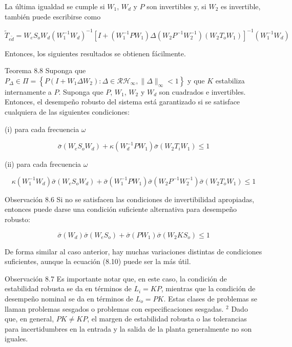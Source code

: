 La última igualdad se cumple si $W_{1}$, $W_{d}$ y $P$ son invertibles y, si $W_{2}$ es invertible, también puede escribirse como

$$
\tilde{T}_{e \tilde{d}}=W_{e} S_{o} W_{d}\left(W_{1}^{-1} W_{d}\right)^{-1}\left[I+\left(W_{1}^{-1} P W_{1}\right) \Delta\left(W_{2} P^{-1} W_{2}^{-1}\right)\left(W_{2} T_{o} W_{1}\right)\right]^{-1}\left(W_{1}^{-1} W_{d}\right)
$$

Entonces, los siguientes resultados se obtienen fácilmente.

Teorema 8.8 Suponga que $P_{\Delta} \in \Pi=\left\{P\left(I+W_{1} \Delta W_{2}\right): \Delta \in \mathcal{R} \mathcal{H}_{\infty},\|\Delta\|_{\infty}<1\right\}$ y que $K$ estabiliza internamente a $P$. Suponga que $P$, $W_{1}$, $W_{2}$ y $W_{d}$ son cuadrados e invertibles. Entonces, el desempeño robusto del sistema está garantizado si se satisface cualquiera de las siguientes condiciones:

(i) para cada frecuencia $\omega$


\begin{equation*}
\bar{\sigma}\left(W_{e} S_{o} W_{d}\right)+\kappa\left(W_{d}^{-1} P W_{1}\right) \bar{\sigma}\left(W_{2} T_{i} W_{1}\right) \leq 1 \tag{8.9}
\end{equation*}


(ii) para cada frecuencia $\omega$


\begin{equation*}
\kappa\left(W_{1}^{-1} W_{d}\right) \bar{\sigma}\left(W_{e} S_{o} W_{d}\right)+\bar{\sigma}\left(W_{1}^{-1} P W_{1}\right) \bar{\sigma}\left(W_{2} P^{-1} W_{2}^{-1}\right) \bar{\sigma}\left(W_{2} T_{o} W_{1}\right) \leq 1 \tag{8.10}
\end{equation*}


Observación 8.6 Si no se satisfacen las condiciones de invertibilidad apropiadas, entonces puede darse una condición suficiente alternativa para desempeño robusto:

$$
\bar{\sigma}\left(W_{d}\right) \bar{\sigma}\left(W_{e} S_{o}\right)+\bar{\sigma}\left(P W_{1}\right) \bar{\sigma}\left(W_{2} K S_{o}\right) \leq 1
$$

De forma similar al caso anterior, hay muchas variaciones distintas de condiciones suficientes, aunque la ecuación (8.10) puede ser la más útil.

Observación 8.7 Es importante notar que, en este caso, la condición de estabilidad robusta se da en términos de $L_{i}=K P$, mientras que la condición de desempeño nominal se da en términos de $L_{o}=P K$. Estas clases de problemas se llaman problemas sesgados o problemas con especificaciones sesgadas. ${ }^{2}$ Dado que, en general, $P K \neq K P$, el margen de estabilidad robusta o las tolerancias para incertidumbres en la entrada y la salida de la planta generalmente no son iguales.

